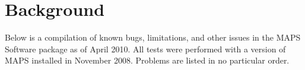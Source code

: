 \documentclass[12pt]{article}
\begin{document}
\bigskip

\bigskip

\bigskip


\bigskip

\section{Background}
Below is a compilation of known bugs,
limitations, and other issues in 
the  MAPS Software package as of April 2010. 
All tests were performed with a version
of MAPS installed in November 2008. Problems are listed in no
particular order.  
\end{document}
